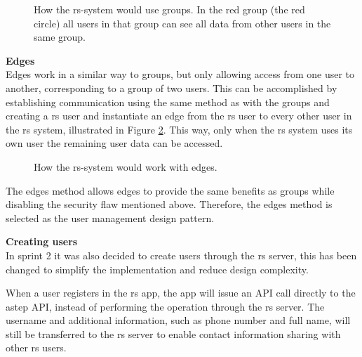 \begin{figure}[h]
	\centering
	\label{fig:astepgroup}
	\caption{How the \gls{rs}-system would use groups. In the red group (the red circle) all users in that group can see all data from other users in the same group.}
\end{figure}

\textbf{Edges}\\ 
Edges work in a similar way to groups, but only allowing access from one user to another, corresponding to a group of two users.
This can be accomplished by establishing communication using the same method as with the groups and creating a \gls{rs} user and instantiate an edge from the \gls{rs} user to every other user in the \gls{rs} system, illustrated in Figure \ref{fig:astepedge}.
This way, only when the \gls{rs} system uses its own user the remaining user data can be accessed.

\begin{figure}[h]
	\centering
	\caption{How the \gls{rs}-system would work with edges.}
	\label{fig:astepedge}
\end{figure}

The edges method allows edges to provide the same benefits as groups while disabling the security flaw mentioned above.
Therefore, the edges method is selected as the user management design pattern.

\textbf{Creating users}\\
In sprint 2 it was also decided to create users through the \gls{rs} server, this has been changed to simplify the implementation and reduce design complexity.

When a user registers in the \gls{rs} app, the app will issue an API call directly to the \gls{astep} API, instead of performing the operation through the \gls{rs} server. 
The username and additional information, such as phone number and full name, will still be transferred to the \gls{rs} server to enable contact information sharing with other \gls{rs} users.